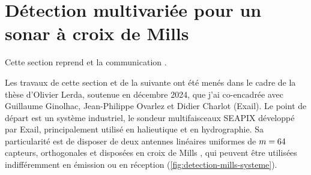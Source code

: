 
\section{Détection multivariée pour un sonar à croix de Mills}
\label{sec:detection-mills-antenna}

\begin{contributions}
  Cette section reprend  et la communication .
\end{contributions}

Les travaux de cette section et de la suivante ont été menés dans le cadre de la thèse d'Olivier Lerda, soutenue en décembre 2024, que j'ai co-encadrée avec Guillaume Ginolhac, Jean-Philippe Ovarlez et Didier Charlot (Exail). Le point de départ est un système industriel, le sondeur multifaisceaux SEAPIX développé par Exail, principalement utilisé en halieutique et en hydrographie. Sa particularité est de disposer de deux antennes linéaires uniformes de $m=64$ capteurs, orthogonales et disposées en croix de Mills , qui peuvent être utilisées indifféremment en émission ou en réception (\cref{fig:detection-mills-systeme}).

